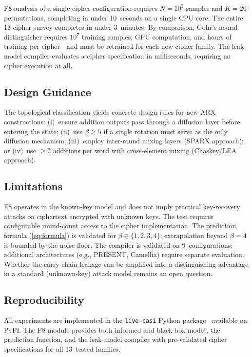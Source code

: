 \documentclass[conference,a4paper]{IEEEtran}
\begin{document}
F8 analysis of a single cipher configuration requires $N = 10^5$ samples and $K = 20$ permutations, completing in under 10~seconds on a single CPU core. The entire 13-cipher survey completes in under 3~minutes. By comparison, Gohr's neural distinguisher requires $10^7$ training samples, GPU computation, and hours of training per cipher---and must be retrained for each new cipher family. The leak-model compiler evaluates a cipher specification in milliseconds, requiring no cipher execution at all.

\subsection{Design Guidance}

The topological classification yields concrete design rules for new ARX constructions: (i)~ensure addition outputs pass through a diffusion layer before entering the state; (ii)~use $\beta \geq 5$ if a single rotation must serve as the only diffusion mechanism; (iii)~employ inter-round mixing layers (SPARX approach); or (iv)~use $\geq$2 additions per word with cross-element mixing (Chaskey/LEA approach).

\subsection{Limitations}

F8 operates in the known-key model and does not imply practical key-recovery attacks on ciphertext encrypted with unknown keys. The test requires configurable round-count access to the cipher implementation. The prediction formula (\ref{eq:formula}) is validated for $\beta \in \{1, 2, 3, 4\}$; extrapolation beyond $\beta = 4$ is bounded by the noise floor. The compiler is validated on 9~configurations; additional architectures (e.g., PRESENT, Camellia) require separate evaluation. Whether the carry-chain leakage can be amplified into a distinguishing advantage in a standard (unknown-key) attack model remains an open question.

\subsection{Reproducibility}

All experiments are implemented in the \texttt{live-casi} Python package~\cite{livecasi} available on PyPI. The F8 module provides both informed and black-box modes, the prediction function, and the leak-model compiler with pre-validated cipher specifications for all 13~tested families.
\end{document}
